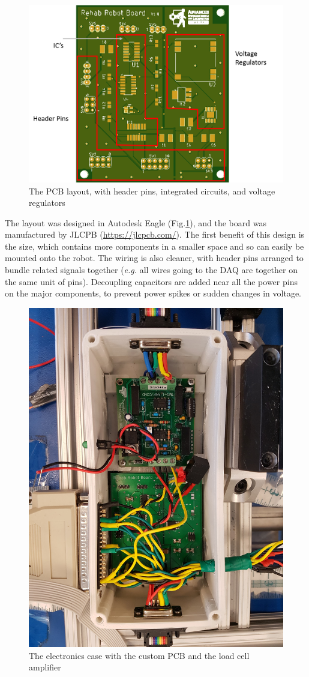\documentclass[12pt]{report}
\begin{document}
			\begin{figure}[p] 
		\centering
		\includegraphics[width=0.8\linewidth]{pcb_pic2}
		\caption{The PCB layout, with header pins, integrated circuits, and voltage regulators}
		\label{fig:pcb_pic2}
	\end{figure}
		
		 The layout was designed in Autodesk Eagle (Fig.\ref{fig:pcb_pic2}), and the board was manufactured by JLCPB (\url{https://jlcpcb.com/}). The first benefit of this design is the size, which contains more components in a smaller space and so can easily be mounted onto the robot. The wiring is also cleaner, with header pins arranged to bundle related signals together (\textit{e.g.} all wires going to the DAQ are together on the same unit of pins). Decoupling capacitors are added near all the power pins on the major components, to prevent power spikes or sudden changes in voltage.
		

	
		



	
		\begin{figure}[h] 
		\centering
		\includegraphics[width=0.75\linewidth]{pcb_case}
		\caption{The electronics case with the custom PCB and the load cell amplifier}
		\label{fig:proto}
	\end{figure}
	
\end{document}
